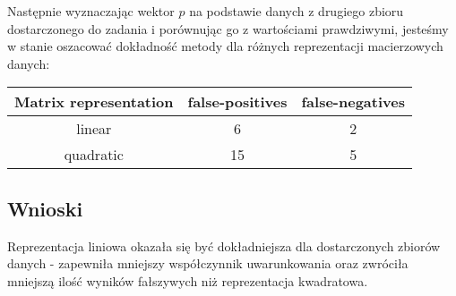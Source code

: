\documentclass{article}
\begin{document}
Następnie wyznaczając wektor $p$ na podstawie danych z drugiego zbioru dostarczonego do
zadania i porównując go z wartościami prawdziwymi, jesteśmy w stanie oszacować dokładność
metody dla różnych reprezentacji macierzowych danych:
\begin{center}
  \begin{tabular}{  |c|c|c| } 
   \hline
   Matrix representation & false-positives & false-negatives\\
   \hline
   linear & 6 & 2\\
   \hline
   quadratic & 15 & 5\\
   \hline
  \end{tabular}
\end{center}
\subsection*{Wnioski}
\null\quad Reprezentacja liniowa okazała się być dokładniejsza dla dostarczonych
zbiorów danych - zapewniła mniejszy współczynnik uwarunkowania oraz zwróciła mniejszą
ilość wyników fałszywych niż reprezentacja kwadratowa.
\end{document}
